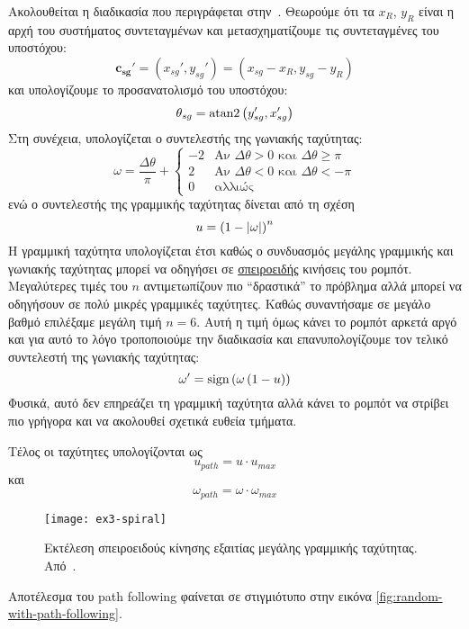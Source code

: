 Ακολουθείται η διαδικασία που περιγράφεται στην~\cite{etsardou-phd}.
Θεωρούμε ότι τα $x_R$, $y_R$ είναι η αρχή του συστήματος συντεταγμένων και μετασχηματίζουμε τις συντεταγμένες του υποστόχου:
\begin{equation}
    \mathbf{c_{sg}'} = \left(x_{sg}', y_{sg}'\right) = \left(x_{sg} - x_R, y_{sg} - y_R\right)
\end{equation}
και υπολογίζουμε το προσανατολισμό του υποστόχου:
\begin{equation}
    \theta_{sg} = \operatorname{atan2}{\left(y_{sg}', x_{sg}'\right)}
\end{equation}
Στη συνέχεια, υπολογίζεται ο συντελεστής της γωνιακής ταχύτητας:
\begin{equation}
    \omega = \frac{\Delta{\theta}}{\pi} +
    \begin{cases}
        -2 & \text{Αν $\Delta{\theta} > 0$ και $\Delta{\theta} \geq \pi$} \\
        2  & \text{Αν $\Delta{\theta} < 0$ και $\Delta{\theta} < -\pi$}   \\
        0  & \text{αλλιώς}
    \end{cases}
\end{equation}
ενώ ο συντελεστής της γραμμικής ταχύτητας δίνεται από τη σχέση
\begin{equation}
    u = \left(1-\left\lvert\omega\right\rvert\right)^n\label{eq:linear-coeff}
\end{equation}
Η γραμμική ταχύτητα υπολογίζεται έτσι καθώς ο συνδυασμός μεγάλης γραμμικής και γωνιακής ταχύτητας μπορεί να οδηγήσει σε \hyperref[fig:ex3-spiral]{σπειροειδής} κινήσεις του ρομπότ.
Μεγαλύτερες τιμές του $n$ αντιμετωπίζουν πιο ``δραστικά'' το πρόβλημα αλλά μπορεί να οδηγήσουν σε πολύ μικρές γραμμικές ταχύτητες.
Καθώς συναντήσαμε σε μεγάλο βαθμό επιλέξαμε μεγάλη τιμή $n = 6$.
Αυτή η τιμή όμως κάνει το ρομπότ αρκετά αργό και για αυτό το λόγο τροποποιούμε την διαδικασία και επανυπολογίζουμε τον τελικό συντελεστή της γωνιακής ταχύτητας:
\begin{equation}
    \omega' = \operatorname{sign}\left({\omega} \left(1 - u\right)\right)
\end{equation}
Φυσικά, αυτό δεν επηρεάζει τη γραμμική ταχύτητα αλλά κάνει το ρομπότ να στρίβει πιο γρήγορα και να ακολουθεί σχετικά ευθεία τμήματα.

Τέλος οι ταχύτητες υπολογίζονται ως
\begin{equation}
    u_{path} = u \cdot u_{max}
\end{equation}
και
\begin{equation}
    \omega_{path} = \omega \cdot \omega_{max}
\end{equation}

\begin{figure}[htb]
    \centering
    \texttt{[image: ex3-spiral]}
    \caption{Εκτέλεση σπειροειδούς κίνησης εξαιτίας μεγάλης γραμμικής ταχύτητας. Από~\protect\cite{etsardou-phd}.}\label{fig:ex3-spiral}
\end{figure}

Αποτέλεσμα του path following φαίνεται σε στιγμιότυπο στην εικόνα \ref{fig:random-with-path-following}.

